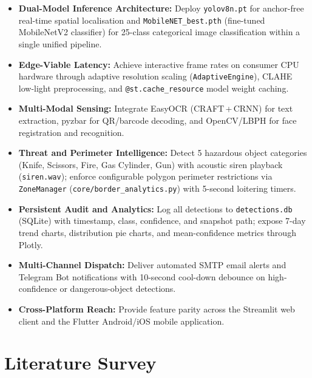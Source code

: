 \documentclass[conference]{IEEEtran}
\begin{document}
\begin{itemize}
    \item \textbf{Dual-Model Inference Architecture:} Deploy \texttt{yolov8n.pt}
          for anchor-free real-time spatial localisation and
          \texttt{MobileNET\_best.pth} (fine-tuned MobileNetV2 classifier) for
          25-class categorical image classification within a single unified
          pipeline.
    \item \textbf{Edge-Viable Latency:} Achieve interactive frame rates on
          consumer CPU hardware through adaptive resolution scaling
          (\texttt{AdaptiveEngine}), CLAHE low-light preprocessing, and
          \texttt{@st.cache\_resource} model weight caching.
    \item \textbf{Multi-Modal Sensing:} Integrate EasyOCR (CRAFT\,+\,CRNN)
          for text extraction, pyzbar for QR/barcode decoding, and OpenCV/LBPH
          for face registration and recognition.
    \item \textbf{Threat and Perimeter Intelligence:} Detect 5 hazardous object
          categories (Knife, Scissors, Fire, Gas Cylinder, Gun) with acoustic
          siren playback (\texttt{siren.wav}); enforce configurable polygon
          perimeter restrictions via \texttt{ZoneManager} (\texttt{core/border\_analytics.py})
          with 5-second loitering timers.
    \item \textbf{Persistent Audit and Analytics:} Log all detections to
          \texttt{detections.db} (SQLite) with timestamp, class, confidence, and
          snapshot path; expose 7-day trend charts, distribution pie charts, and
          mean-confidence metrics through Plotly.
    \item \textbf{Multi-Channel Dispatch:} Deliver automated SMTP email alerts
          and Telegram Bot notifications with 10-second cool-down debounce on
          high-confidence or dangerous-object detections.
    \item \textbf{Cross-Platform Reach:} Provide feature parity across the
          Streamlit web client and the Flutter Android/iOS mobile application.
\end{itemize}

\section{Literature Survey}
\end{document}
